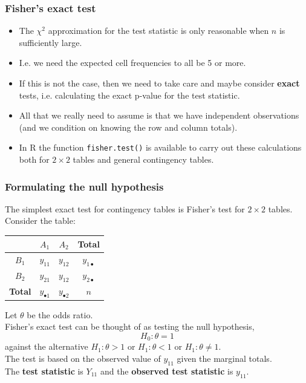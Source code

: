 \documentclass[a4paper]{article}\usepackage[]{graphicx}\usepackage[]{xcolor}
\begin{document}
\subsubsection{Fisher's exact test}
\begin{itemize}
	\item The \( \chi^2 \) approximation for the test statistic is only reasonable when \( n \) is sufficiently large.
	\item I.e. we need the expected cell frequencies to all be 5 or more.
	\item If this is not the case, then we need to take care and maybe consider \textbf{exact} tests, i.e. calculating the exact p-value for the test statistic.
	\item All that we really need to assume is that we have independent observations (and we condition on knowing the row and column totals).
	\item In R the function \lstinline|fisher.test()|  is available to carry out these calculations both for \( 2 \times 2 \) tables and general contingency tables.
\end{itemize}
\subsubsection{Formulating the null hypothesis}
The simplest exact test for contingency tables is Fisher's test for \( 2 \times 2 \) tables.
Consider the table:
\begin{table}[H]
	\centering
	\begin{tabular}{@{}c|cc|c@{}}
	\toprule
				   & \( A_1 \)          & \( A_2 \)          & \textbf{Total}     \\ \midrule
	\( B_1 \)      & \( y_{11} \)       & \( y_{12} \)       & \( y_{1\bullet} \) \\
	\( B_2 \)      & \( y_{21} \)       & \( y_{12} \)       & \( y_{2\bullet} \) \\ \midrule
	\textbf{Total} & \( y_{\bullet1} \) & \( y_{\bullet2} \) & \( n \)            \\ \bottomrule
	\end{tabular}
\end{table}
Let \( \theta \) be the \textcolor{myred}{odds ratio}.\\
Fisher's exact test can be thought of as testing the null hypothesis,
\[
	H_0: \theta = 1
\]
against the alternative \( H_1: \theta > 1 \) or \( H_1: \theta < 1 \) or \( H_1: \theta \neq 1 \).\\
The test is based on the observed value of \( y_{11} \) given the marginal totals.\\
The \textbf{test statistic} is \( Y_{11} \) and the \textbf{observed test statistic} is \( y_{11} \).
\end{document}
